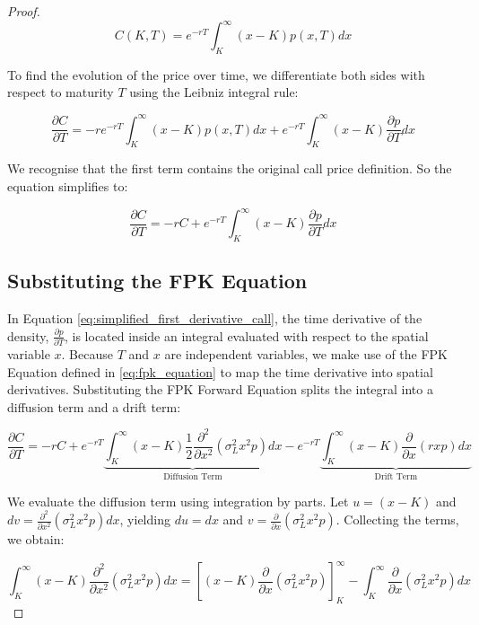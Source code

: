 \documentclass[12pt,oneside]{report}
\theoremstyle{definition}
\theoremstyle{remark}
\begin{document}
\begin{proof}
$$C(K, T) = e^{-rT} \int_{K}^{\infty} (x - K) p(x, T) dx$$

To find the evolution of the price over time, we differentiate both sides with respect to maturity $T$ using the Leibniz integral rule:

$$\frac{\partial C}{\partial T} = -r e^{-rT} \int_{K}^{\infty} (x - K) p(x, T) dx + e^{-rT} \int_{K}^{\infty} (x - K) \frac{\partial p}{\partial T} dx$$

We recognise that the first term contains the original call price definition. So the equation simplifies to:

\begin{equation}
\frac{\partial C}{\partial T} = -rC + e^{-rT} \int_{K}^{\infty} (x - K) \frac{\partial p}{\partial T} dx
\label{eq:simplified_first_derivative_call}
\end{equation}

\subsection{Substituting the FPK Equation}

In Equation \ref{eq:simplified_first_derivative_call}, the time derivative of the density, $\frac{\partial p}{\partial T}$, is located inside an integral evaluated with respect to the spatial variable $x$. Because $T$ and $x$ are independent variables, we make use of the FPK Equation defined in \ref{eq:fpk_equation} to map the time derivative into spatial derivatives. Substituting the FPK Forward Equation splits the integral into a diffusion term and a drift term:

\begin{equation}
\frac{\partial C}{\partial T} = -rC 
+ e^{-rT} \underbrace{\int_{K}^{\infty} (x - K) \frac{1}{2} \frac{\partial^2}{\partial x^2} \left( \sigma_L^2 x^2 p \right) dx}_{\text{Diffusion Term}} 
- e^{-rT} \underbrace{\int_{K}^{\infty} (x - K) \frac{\partial}{\partial x} (r x p) dx}_{\text{Drift Term}}
\label{eq:time_derivative_eq}
\end{equation}

We evaluate the diffusion term using integration by parts. Let $u = (x - K)$ and $dv = \frac{\partial^2}{\partial x^2} \left( \sigma_L^2 x^2 p \right) dx$, yielding $du = dx$ and $v = \frac{\partial}{\partial x} \left( \sigma_L^2 x^2 p \right)$. Collecting the terms, we obtain:

$$\int_{K}^{\infty} (x - K) \frac{\partial^2}{\partial x^2} \left( \sigma_L^2 x^2 p \right) dx = 
\left[ (x - K) \frac{\partial}{\partial x} \left( \sigma_L^2 x^2 p \right) \right]_{K}^{\infty} - \int_{K}^{\infty} \frac{\partial}{\partial x} \left( \sigma_L^2 x^2 p \right) dx$$


\end{proof}
\end{document}
